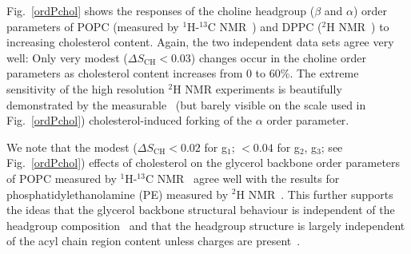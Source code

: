 \documentclass[journal=jacsat,manuscript=article]{achemso}
\begin{document}
Fig.~\ref{ordPchol} shows the responses of the choline headgroup ($\beta$ and $\alpha$)
order parameters of POPC (measured by $^1$H-$^{13}$C NMR~\cite{ferreira13}) and DPPC
($^{2}$H NMR~\cite{brown78}) to increasing cholesterol content.
Again, the two independent data sets agree very well:
Only very modest ($\Delta S_\mathrm{CH}<0.03$) changes occur in  the choline order parameters as cholesterol content
increases from 0 to 60\%.
The extreme sensitivity of the
high resolution $^{2}$H NMR experiments
is beautifully demonstrated by the measurable~\cite{brown78}
(but barely visible on the scale used in Fig.~\ref{ordPchol})
cholesterol-induced forking of the $\alpha$ order parameter.

We note that the modest ($\Delta S_\mathrm{CH}<0.02$ for g$_1$; $<0.04$ for g$_2$, g$_3$; see Fig.~\ref{ordPchol})
effects of cholesterol
on the glycerol backbone order parameters of POPC
measured by $^1$H-$^{13}$C NMR~\cite{ferreira13}
agree well with the results for phosphatidylethanolamine (PE) measured by $^{2}$H NMR~\cite{ghosh82}.
This further supports the ideas that the glycerol backbone structural behaviour is independent of the
headgroup composition~\cite{gally81} and that the headgroup structure is largely independent of the acyl chain region content unless
charges are present~\cite{scherer87}.
\end{document}
